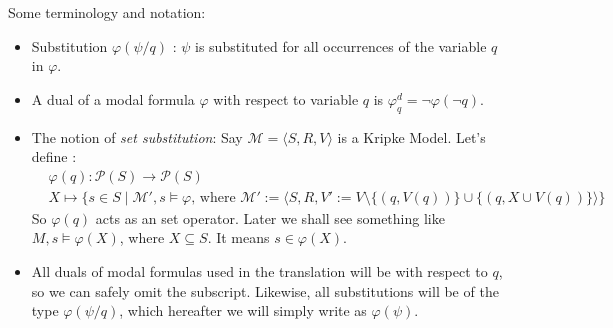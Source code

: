 \documentclass[10pt]{article}
\renewcommand{\phi}{\varphi}
\begin{document}
		Some terminology and notation:
		\begin{itemize}
			\item Substitution $\phi(\psi/q)$ : $\psi$ is substituted for all occurrences of the variable $q$ in $\phi$.
			\item A dual of a modal formula $\phi$ with respect to variable $q$ is $\phi_q^d = \neg\phi(\neg q)$.
			\item The notion of \textit{set substitution}: Say $\mathcal{M} = \langle S,R,V \rangle$ is a Kripke Model. Let's define : 
			\begin{equation} 
				\begin{split}
					& \phi(q) : \mathcal{P}(S) \rightarrow \mathcal{P}(S)\\
					& X \mapsto \{s \in S \mid \mathcal{M'}, s \models \phi \text{, where } \mathcal{M'}:= \langle S, R, V' := V\setminus\{(q,V(q))\} \cup \{(q,X\cup V(q)) \} \rangle \}
				\end{split}
			\end{equation} 
			So $\phi(q)$ acts as an set operator. Later we shall see something like $M,s\models \phi(X)$, where $X\subseteq S$. It means $s\in \phi(X)$.
			
			\item  All duals of modal formulas used in the translation will be with respect to
			$q$, so we can safely omit the subscript. Likewise, all substitutions will be of
			the type $\phi(\psi/q)$, which hereafter we will simply write as $\phi(\psi)$.
		\end{itemize}
		
\end{document}
